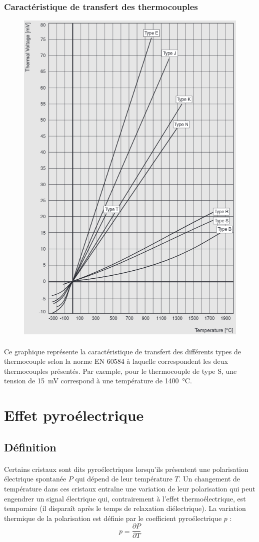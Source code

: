 \documentclass{article}
\begin{document}
        \subsubsection{Caractéristique de transfert des thermocouples}
        \begin{figure}[H]
            \centering
            \includegraphics[width=0.6\linewidth]{./images/thermocouple-schema.png}
        \end{figure}

        \paragraph{}
        Ce graphique représente la caractéristique de transfert des différents types de thermocouple selon la norme EN 60584 à laquelle correspondent les deux thermocouples présentés. Par exemple, pour le thermocouple de type S, une tension de \SI{15}{\milli\volt} correspond à une température de \SI{1400}{\celsius}.


    \newpage
    \section{Effet pyroélectrique}

    \subsection{Définition}
    \paragraph{}
    Certains cristaux sont dits pyroélectriques lorsqu'ils présentent une polarisation électrique spontanée $P$ qui dépend de leur température $T$. Un changement de température dans ces cristaux entraîne une variation de leur polarisation qui peut engendrer un signal électrique qui, contrairement à l'effet thermoélectrique, est temporaire (il disparaît après le temps de relaxation diélectrique). La variation thermique de la polarisation est définie par le coefficient pyroélectrique $p$ : $$ p = \frac{\partial P}{\partial T}$$
\end{document}

